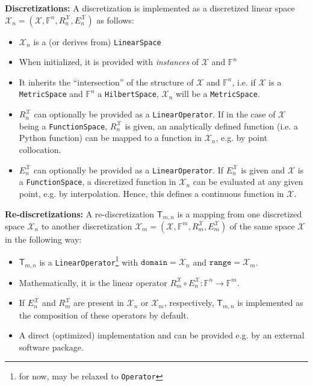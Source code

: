 \documentclass[a4paper]{paper}
\newcommand{\VecSpace}[1]{\mathscr{#1}}
\newcommand{\Field}{\mathbb{F}}
\newcommand{\DiscOp}[1]{\mathsf{#1}}
\newcommand*{\EXT}[2]{\ensuremath{E_{#1}^{#2}}}
\newcommand*{\REST}[2]{\ensuremath{R_{#1}^{#2}}}
\newcommand*{\RnX}{\ensuremath{\REST{n}{\VecSpace{X}}}}
\newcommand*{\RmX}{\ensuremath{\REST{m}{\VecSpace{X}}}}
\newcommand*{\EnX}{\ensuremath{\EXT{n}{\VecSpace{X}}}}
\newcommand*{\EmX}{\ensuremath{\EXT{m}{\VecSpace{X}}}}
\begin{document}
\textbf{Discretizations:}
A discretization is implemented as a discretized linear space $\VecSpace{X}_n = (\VecSpace{X}, \Field^n, \RnX, \EnX)$ as follows:
%
\begin{itemize}
 \item $\VecSpace{X}_n$ is a (or derives from) \texttt{LinearSpace}
 \item When initialized, it is provided with \emph{instances} of $\VecSpace{X}$ and $\Field^n$
 \item It inherits the ``intersection'' of the structure of $\VecSpace{X}$ and $\Field^n$, i.e. if $\VecSpace{X}$ is a 
 \texttt{MetricSpace} and $\Field^n$ a \texttt{HilbertSpace}, $\VecSpace{X}_n$ will be a \texttt{MetricSpace}.
 \item $\RnX$ can optionally be provided as a \texttt{LinearOperator}. If in the case of $\VecSpace{X}$ being a \texttt{FunctionSpace}, 
 $\RnX$ is given, an analytically defined function (i.e. a   Python function) can be mapped to a function in $\VecSpace{X}_n$, e.g. by 
 point collocation.
 \item $\EnX$ can optionally be provided as a \texttt{LinearOperator}. If $\EnX$ is given and $\VecSpace{X}$ is a \texttt{FunctionSpace}, 
 a discretized function in $\VecSpace{X}_n$ can be evaluated at any given point, e.g. by interpolation. Hence, this defines a continuous 
 function in $\VecSpace{X}$.
\end{itemize}
%
\textbf{Re-discretizations:}
A re-discretization $\DiscOp{T}_{m,n}$ is a mapping from one discretized space $\VecSpace{X}_n$ to another discretization 
$\VecSpace{X}_m = (\VecSpace{X}, \Field^m, \RmX, \EmX)$ of the same space $\VecSpace{X}$ in the following way:
%
\begin{itemize}
 \item $\DiscOp{T}_{m,n}$ is a \texttt{LinearOperator}\footnote{for now, may be relaxed to \texttt{Operator}} with 
 $\mathtt{domain} = \VecSpace{X}_n$ and $\mathtt{range} = \VecSpace{X}_m$.
 \item Mathematically, it is the linear operator $\RmX \circ \EnX: \Field^n \to \Field^m$.
 \item If $\EnX$ and $\RmX$ are present in $\VecSpace{X}_n$ or $\VecSpace{X}_m$, respectively, $\DiscOp{T}_{m,n}$ is implemented as the 
 composition of these operators by default.
 \item A direct (optimized) implementation and can be provided e.g. by an external software package.
\end{itemize}
\end{document}
